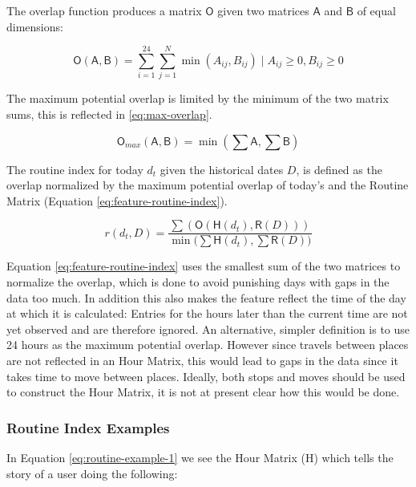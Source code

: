 The overlap function produces a matrix $\mathsf{O}$ given two matrices $\mathsf{A}$ and $\mathsf{B}$ of equal dimensions:

\begin{equation}
\label{eq:overlap-function}
    \mathsf{O}(\mathsf{A}, \mathsf{B}) = \sum_{i=1}^{24} \sum_{j=1}^{N} \min (A_{ij}, B_{ij}) \;|\; A_{ij} \geq 0, B_{ij} \geq 0
\end{equation}

The maximum potential overlap is limited by the minimum of the two matrix sums, this is reflected in \eqref{eq:max-overlap}.

\begin{equation}
\label{eq:max-overlap}
    \mathsf{O}_{max}(\mathsf{A}, \mathsf{B}) = \min (\sum \mathsf{A}, \sum \mathsf{B})
\end{equation}

The routine index for today $d_t$ given the historical dates $D$, is defined as the overlap normalized by the maximum potential overlap of today's  and the Routine Matrix (Equation \eqref{eq:feature-routine-index}).

\begin{equation}
\label{eq:feature-routine-index}
r(d_t, D) = \frac{\sum (\mathsf{O} (\mathsf{H}(d_t), \mathsf{R}(D)))}{\min \Big(\sum \mathsf{H}(d_t), \sum \mathsf{R}(D) \Big)}
\end{equation}

Equation \eqref{eq:feature-routine-index} uses the smallest sum of the two matrices to normalize the overlap, which is done to avoid punishing days with gaps in the data too much. In addition this also makes the feature reflect the time of the day at which it is calculated: Entries for the hours later than the current time are not yet observed and are therefore ignored. An alternative, simpler definition is to use 24 hours as the maximum potential overlap. However since travels between places are not reflected in an Hour Matrix, this would lead to gaps in the data since it takes time to move between places. Ideally, both stops and moves should be used to construct the Hour Matrix, it is not at present clear how this would be done.  

\subsubsection*{Routine Index Examples}

In Equation \eqref{eq:routine-example-1} we see the Hour Matrix (H) which tells the story of a user doing the following:

